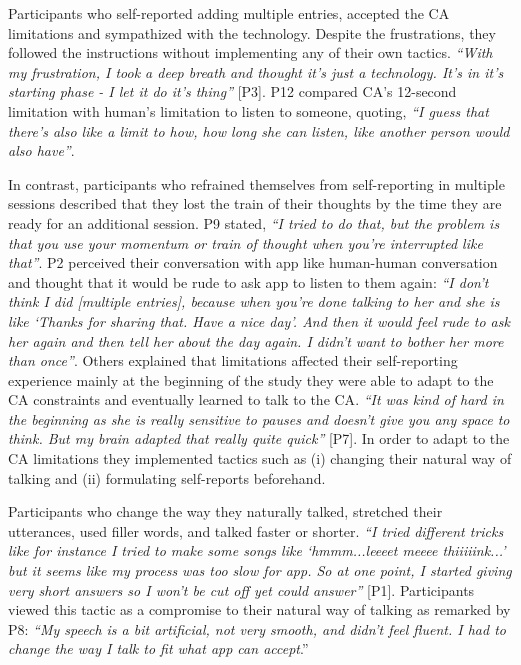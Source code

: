             Participants who self-reported adding multiple entries, accepted the \ac{CA} limitations and sympathized with the technology. Despite the frustrations, they followed the instructions without implementing any of their own tactics.
                \textit{``With my frustration, I took a deep breath and thought it’s just a technology. It’s in it’s starting phase - I let it do it’s thing''} [P3].
            P12 compared \ac{CA}'s 12-second limitation with human's limitation to listen to someone, quoting,
                \textit{``I guess that there's also like a limit to how, how long she can listen, like another person would also have''}.

            In contrast, participants who refrained themselves from self-reporting in multiple sessions described that they lost the train of their thoughts by the time they are ready for an additional session. P9 stated,
                \textit{``I tried to do that, but the problem is that you use your momentum or train of thought when you're interrupted like that''}.
            P2 perceived their conversation with \acl{app} like human-human conversation and thought that it would be rude to ask \acl{app} to listen to them again:
                \textit{``I don't think I did [multiple entries], because when you're done talking to her and she is like `Thanks for sharing that. Have a nice day'. And then it would feel rude to ask her again and then tell her about the day again. I didn't want to bother her more than once''}.
            Others explained that limitations affected their self-reporting experience mainly at the beginning of the study they were able to adapt to the \ac{CA} constraints and eventually learned to talk to the \ac{CA}.
                \textit{``It was kind of hard in the beginning as she is really sensitive to pauses and doesn't give you any space to think. But my brain adapted that really quite quick''} [P7].
            In order to adapt to the \ac{CA} limitations they implemented tactics such as (i) changing their natural way of talking and (ii) formulating self-reports beforehand.
            
            Participants who change the way they naturally talked, stretched their utterances, used filler words, and talked faster or shorter. 
                \textit{``I tried different tricks like for instance I tried to make some songs like `hmmm...leeeet meeee thiiiiink...' but it seems like my process was too slow for \acl{app}. So at one point, I started giving very short answers so I won’t be cut off yet could answer''} [P1].
            Participants viewed this tactic as a compromise to their natural way of talking as remarked by P8:
                \textit{``My speech is a bit artificial, not very smooth, and didn't feel fluent. I had to change the way I talk to fit what \acl{app} can accept}.''
                
